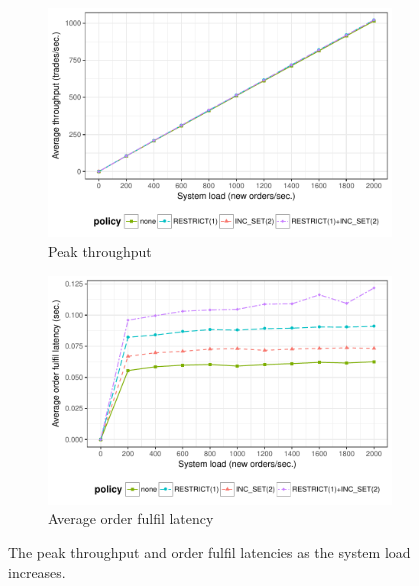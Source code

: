 \begin{figure}[t]
	\centering
	\begin{subfigure}[t]{.5\textwidth}
		\centering
		\captionsetup{width=.9\linewidth}
		\includegraphics[width=.95\linewidth]{xchange/assets/experiments/scalability}
		\caption{Peak throughput}
		\label{fig:scalability}
	\end{subfigure}%
	\begin{subfigure}[t]{.5\textwidth}
		\centering
		\captionsetup{width=.9\linewidth}
		\includegraphics[width=.95\linewidth]{xchange/assets/experiments/latency}
		\caption{Average order fulfil latency}
		\label{fig:latency}
	\end{subfigure}%
	\caption{The peak throughput and order fulfil latencies as the system load increases.}
	\label{fig:scalability_latency}
\end{figure}

